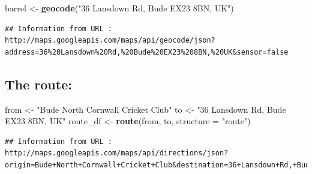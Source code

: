 \documentclass[]{article}
\newenvironment{Shaded}{\begin{snugshade}}{\end{snugshade}}
\newcommand{\DataTypeTok}[1]{\textcolor[rgb]{0.13,0.29,0.53}{#1}}
\newcommand{\KeywordTok}[1]{\textcolor[rgb]{0.13,0.29,0.53}{\textbf{#1}}}
\newcommand{\NormalTok}[1]{#1}
\newcommand{\StringTok}[1]{\textcolor[rgb]{0.31,0.60,0.02}{#1}}
\begin{document}
\begin{Shaded}
\begin{Highlighting}[]
\NormalTok{barrel <-}\StringTok{ }\KeywordTok{geocode}\NormalTok{(}\StringTok{"36 Lansdown Rd, Bude EX23 8BN, UK"}\NormalTok{)}
\end{Highlighting}
\end{Shaded}

\begin{verbatim}
## Information from URL : http://maps.googleapis.com/maps/api/geocode/json?address=36%20Lansdown%20Rd,%20Bude%20EX23%208BN,%20UK&sensor=false
\end{verbatim}

\hypertarget{the-route}{%
\subsection{The route:}\label{the-route}}

\begin{Shaded}
\begin{Highlighting}[]
\NormalTok{from <-}\StringTok{ "Bude North Cornwall Cricket Club"}
\NormalTok{to <-}\StringTok{ "36 Lansdown Rd, Bude EX23 8BN, UK"}
\NormalTok{route_df <-}\StringTok{ }\KeywordTok{route}\NormalTok{(from, to, }\DataTypeTok{structure =} \StringTok{"route"}\NormalTok{)}
\end{Highlighting}
\end{Shaded}

\begin{verbatim}
## Information from URL : http://maps.googleapis.com/maps/api/directions/json?origin=Bude+North+Cornwall+Cricket+Club&destination=36+Lansdown+Rd,+Bude+EX23+8BN,+UK&mode=driving&units=metric&alternatives=false&sensor=false
\end{verbatim}
\end{document}
